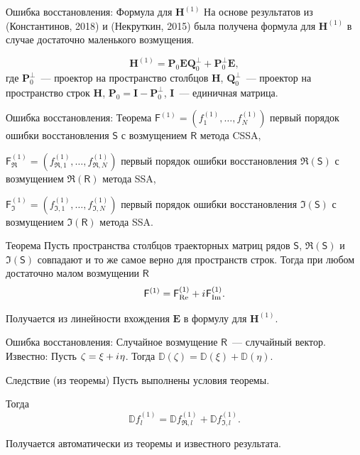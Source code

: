 \documentclass[ucs, notheorems, handout]{beamer}
\newcommand{\tX}[1]{\mathsf{#1}}
\newcommand{\iu}{{i\mkern1mu}}
\begin{document}
\begin{frame}{Ошибка восстановления: Формула для $\mathbf{H}^{(1)}$}
На основе результатов из (Константинов, 2018) и (Некруткин, 2015) была получена формула для $\mathbf{H}^{(1)}$ в случае достаточно маленького возмущения.

\begin{equation*} \label{eq:main}
	\mathbf{H}^{(1)} = \mathbf{P}_0 \mathbf{E} \mathbf{Q}^{\perp}_0 + \mathbf{P}^{\perp}_0 \mathbf{E},
\end{equation*}
где $\mathbf{P}^{\perp}_0$~--- проектор на пространство столбцов $\mathbf{H}$, $\mathbf{Q}^{\perp}_0$~--- проектор на пространство строк $\mathbf{H}$, $\mathbf{P}_0 = \mathbf{I} - \mathbf{P}^{\perp}_0$, $\mathbf{I}$~--- единичная матрица.
\end{frame}

\begin{frame}{Ошибка восстановления: Теорема}
    $\tX{F}^{(1)} = (f^{(1)}_1, \ldots, f^{(1)}_N)$ первый порядок ошибки восстановления $\tX{S}$ с возмущением $\tX{R}$ метода CSSA,

    $\tX{F}^{(1)}_{\Re} = (f^{(1)}_{\Re,1}, \ldots, f^{(1)}_{\Re, N})$ первый порядок ошибки восстановления $\Re(\tX{S})$ с возмущением $\Re(\tX{R})$ метода SSA,

    $\tX{F}^{(1)}_{\Im} = (f^{(1)}_{\Im,1}, \ldots, f^{(1)}_{\Im, N})$ первый порядок ошибки восстановления $\Im(\tX{S})$ с возмущением $\Im(\tX{R})$ метода SSA.
    
    \begin{block}{Теорема \label{th:sum}}
        Пусть пространства столбцов траекторных матриц рядов $\tX{S}$, $\Re(\tX{S})$ и $\Im(\tX{S})$ совпадают и то же самое верно для пространств строк.
    Тогда при любом достаточно малом возмущении $\tX{R}$ 
    $$\tX{F}^{(1)} = \tX{F}^{(1)}_{\Re} + \iu\tX{F}^{(1)}_{\Im}.$$
    \end{block}
    Получается из линейности вхождения $\mathbf{E}$ в формулу для $\mathbf{H}^{(1)}$.
\end{frame}

\begin{frame}{Ошибка восстановления: Случайное возмущение}
    $\tX{R}$~--- случайный вектор.\\
    \vspace{1em}
    \alert{Известно:} Пусть $\zeta = \xi + \iu\eta$. Тогда $\mathbb{D}(\zeta) = \mathbb{D}(\xi) + \mathbb{D}(\eta)$.
    \begin{block}{Следствие (из теоремы)}
        Пусть выполнены условия теоремы.
	
	Тогда
	\begin{equation*} \label{eq:dispsum}
	\mathbb{D}f^{(1)}_l = \mathbb{D}f^{(1)}_{\Re, l} + \mathbb{D}f^{(1)}_{\Im, l}.	
	\end{equation*}
    \end{block}
    Получается автоматически из теоремы и известного результата.
    
\end{frame}
\end{document}
